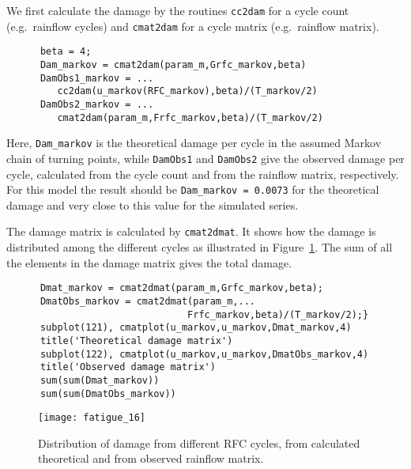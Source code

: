 
We first calculate the damage by the routines {\tt cc2dam}
for a cycle count (e.g.\ rainflow cycles) and {\tt cmat2dam} for
a cycle matrix (e.g.\ rainflow matrix).
{\small\begin{verbatim}
      beta = 4;
      Dam_markov = cmat2dam(param_m,Grfc_markov,beta)
      DamObs1_markov = ...
         cc2dam(u_markov(RFC_markov),beta)/(T_markov/2)
      DamObs2_markov = ...
         cmat2dam(param_m,Frfc_markov,beta)/(T_markov/2)
\end{verbatim}}
Here, \verb+Dam_markov+ is the theoretical damage per cycle in the
assumed Markov chain of turning points, while \verb+DamObs1+ and
\verb+DamObs2+ give the observed damage per cycle, calculated
from the cycle count and from the rainflow matrix, respectively.
For this model the result should be
\verb+Dam_markov = 0.0073+ for the theoretical damage and very
close to this value for the simulated series.

The damage matrix is calculated by {\tt cmat2dmat}. It shows how the
damage is distributed among the different cycles as illustrated in
Figure~\ref{fig_wafo_6.11}. The sum of all the
elements in the damage matrix gives the total damage.
{\small\begin{verbatim}
      Dmat_markov = cmat2dmat(param_m,Grfc_markov,beta);
      DmatObs_markov = cmat2dmat(param_m,...
                                Frfc_markov,beta)/(T_markov/2);}
      subplot(121), cmatplot(u_markov,u_markov,Dmat_markov,4)
      title('Theoretical damage matrix')
      subplot(122), cmatplot(u_markov,u_markov,DmatObs_markov,4)
      title('Observed damage matrix')
      sum(sum(Dmat_markov))
      sum(sum(DmatObs_markov))
\end{verbatim}}

\begin{figure}
\centering
\texttt{[image: fatigue\_16]}
\vspace{-3mm}
\caption[Distribution of damage from RFC cycles]
{Distribution of damage from different RFC cycles,
from calculated theoretical and from observed rainflow matrix.}
\label{fig_wafo_6.11}
\end{figure}

